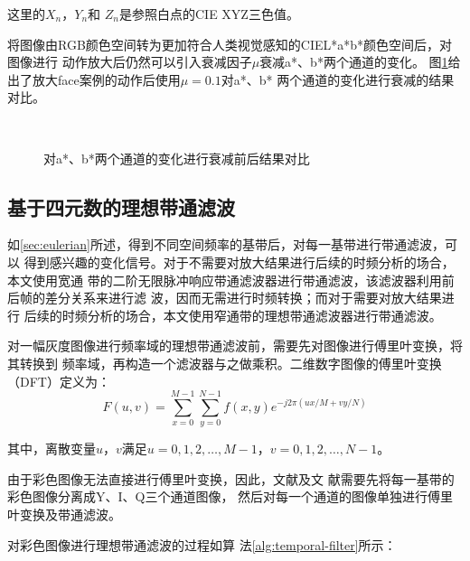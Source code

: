 这里的$X_n$，$Y_n$和 $Z_n$是参照白点的CIE XYZ三色值。

将图像由RGB颜色空间转为更加符合人类视觉感知的CIEL*a*b*颜色空间后，对图像进行
动作放大后仍然可以引入衰减因子$\mu$衰减a*、b*两个通道的变化。
图\ref{fig:attenuation}给出了放大face案例的动作后使用$\mu = 0.1$对a*、b*
两个通道的变化进行衰减的结果对比。

\begin{figure}[htbp]
  \centering
  \\
  \caption{对a*、b*两个通道的变化进行衰减前后结果对比}
  \label{fig:attenuation}
\end{figure}

\subsection{基于四元数的理想带通滤波}
\label{sec:real-quaternion-fourier}

如\ref{sec:eulerian}所述，得到不同空间频率的基带后，对每一基带进行带通滤波，可以
得到感兴趣的变化信号。对于不需要对放大结果进行后续的时频分析的场合，本文使用宽通
带的二阶无限脉冲响应带通滤波器进行带通滤波，该滤波器利用前后帧的差分关系来进行滤
波，因而无需进行时频转换；而对于需要对放大结果进行
后续的时频分析的场合，本文使用窄通带的理想带通滤波器进行带通滤波。

对一幅灰度图像进行频率域的理想带通滤波前，需要先对图像进行傅里叶变换，将其转换到
频率域，再构造一个滤波器与之做乘积。二维数字图像的傅里叶变换（DFT）定义为：
\begin{equation}
  \label{eq:dft}
  F(u,v)=\sum_{x=0}^{M-1}\sum_{y=0}^{N-1}f(x,y)e^{-j2\pi(ux/M+vy/N)}
\end{equation}

其中，离散变量$u$，$v$满足$u=0,1,2,\ldots,M-1$，$v=0,1,2,\ldots,N-1$。

由于彩色图像无法直接进行傅里叶变换，因此，文献\cite{wu2012eulerian}及文
献\cite{Wadhwa2013PhaseBased}需要先将每一基带的彩色图像分离成Y、I、Q三个通道图像，
然后对每一个通道的图像单独进行傅里叶变换及带通滤波。

对彩色图像进行理想带通滤波的过程如算
法\ref{alg:temporal-filter}所示：

